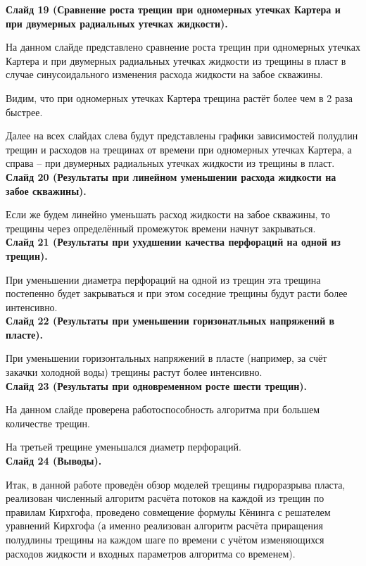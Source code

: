 \documentclass[a4paper, 12pt]{article}
\begin{document}
\textbf{Слайд 19 (Сравнение роста трещин при одномерных утечках Картера и при двумерных радиальных утечках жидкости).}

На данном слайде представлено сравнение роста трещин при одномерных утечках Картера и при двумерных радиальных утечках жидкости из трещины в пласт в случае синусоидального изменения расхода жидкости на забое скважины.

Видим, что при одномерных утечках Картера трещина растёт более чем в 2 раза быстрее.

Далее на всех слайдах слева будут представлены графики зависимостей полудлин трещин и расходов на трещинах от времени при одномерных утечках Картера, а справа -- при двумерных радиальных утечках жидкости из трещины в пласт.
\\


\textbf{Слайд 20 (Результаты при линейном уменьшении расхода жидкости на забое скважины).}

Если же будем линейно уменьшать расход жидкости на забое скважины, то трещины через определённый промежуток времени начнут закрываться.
\\


\textbf{Слайд 21 (Результаты при ухудшении качества перфораций на одной из трещин).}

При уменьшении диаметра перфораций на одной из трещин эта трещина постепенно будет закрываться и при этом соседние трещины будут расти более интенсивно.
\\


\textbf{Слайд 22 (Результаты при уменьшении горизонатльных напряжений в пласте).}

При уменьшении горизонтальных напряжений в пласте (например, за счёт закачки холодной воды) трещины растут более интенсивно.
\\


\textbf{Слайд 23 (Результаты при одновременном росте шести трещин).}

На данном слайде проверена работоспособность алгоритма при большем количестве трещин.

На третьей трещине уменьшался диаметр перфораций.
\\


\textbf{Слайд 24 (Выводы).}

Итак, в данной работе проведён обзор моделей трещины гидроразрыва пласта, реализован численный алгоритм расчёта потоков на каждой из трещин по правилам Кирхгофа, проведено совмещение формулы Кёнинга с решателем уравнений Кирхгофа (а именно реализован алгоритм расчёта приращения полудлины трещины на каждом шаге по времени с учётом изменяющихся расходов жидкости и входных параметров алгоритма со временем).
\end{document}
